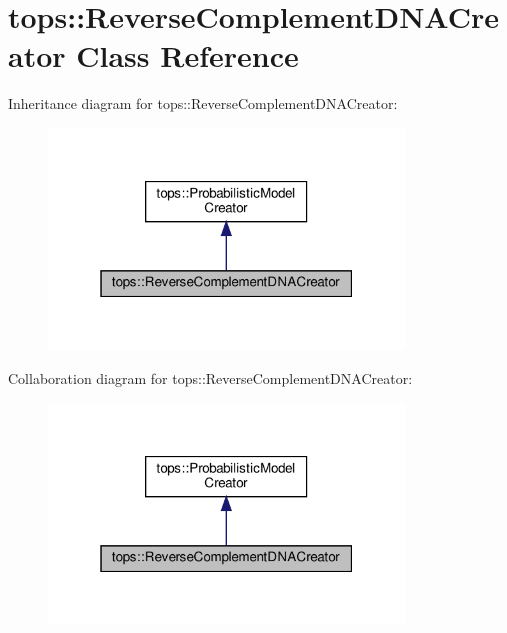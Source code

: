 \hypertarget{classtops_1_1ReverseComplementDNACreator}{}\section{tops\+:\+:Reverse\+Complement\+D\+N\+A\+Creator Class Reference}
\label{classtops_1_1ReverseComplementDNACreator}


Inheritance diagram for tops\+:\+:Reverse\+Complement\+D\+N\+A\+Creator\+:
\nopagebreak
\begin{figure}[H]
\begin{center}
\leavevmode
\includegraphics[width=268pt]{classtops_1_1ReverseComplementDNACreator__inherit__graph}
\end{center}
\end{figure}


Collaboration diagram for tops\+:\+:Reverse\+Complement\+D\+N\+A\+Creator\+:
\nopagebreak
\begin{figure}[H]
\begin{center}
\leavevmode
\includegraphics[width=268pt]{classtops_1_1ReverseComplementDNACreator__coll__graph}
\end{center}
\end{figure}
